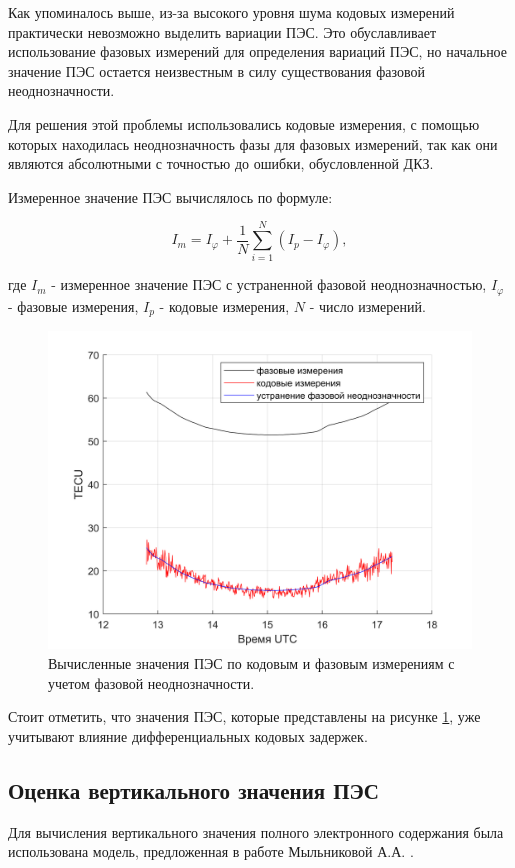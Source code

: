 \documentclass[a4paper]{article}
\begin{document}
Как упоминалось выше, из-за высокого уровня шума кодовых измерений практически невозможно выделить вариации ПЭС. Это обуславливает использование фазовых измерений для определения вариаций ПЭС, но начальное значение ПЭС остается неизвестным в силу существования фазовой неоднозначности.

Для решения этой проблемы использовались кодовые измерения, с помощью которых находилась неоднозначность фазы для фазовых измерений, так как они являются абсолютными с точностью до ошибки, обусловленной ДКЗ.

Измеренное значение ПЭС вычислялось по формуле:

\begin{equation}
I_{m} = I_{\varphi} + \frac{1}{N}\sum_{i=1}^N (I_p - I_{\varphi}),
\end{equation}

где $I_m$ - измеренное значение ПЭС с устраненной фазовой неоднозначностью, $I_\varphi$ - фазовые измерения, $I_p$ - кодовые измерения, $N$ - число измерений.  

\begin{figure}[h!]
\centering
\includegraphics[width = 1\linewidth]{pics/clean_pics/stec.png}
\caption{Вычисленные значения ПЭС по кодовым и фазовым измерениям с учетом фазовой неоднозначности.}
\label{stecplot}
\end{figure}

Стоит отметить, что значения ПЭС, которые представлены на рисунке \ref{stecplot}, уже учитывают влияние дифференциальных кодовых задержек.

\clearpage
\newpage
\subsection{Оценка вертикального значения ПЭС}
Для вычисления вертикального значения полного электронного содержания была использована модель, предложенная в работе Мыльниковой А.А. \cite{milnikova}.
\end{document}
